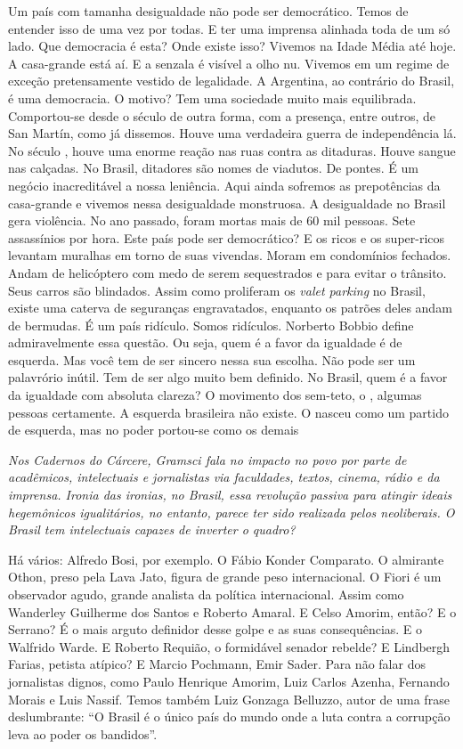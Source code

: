 \normalfont
Um país com tamanha desigualdade não pode ser
democrático. Temos de entender isso de uma vez por todas. E ter uma
imprensa alinhada toda de um só lado. Que democracia é esta? Onde existe
isso? Vivemos na Idade Média até hoje. A casa-grande está aí. E a
senzala é visível a olho nu. Vivemos em um regime de exceção
pretensamente vestido de legalidade. A Argentina, ao contrário do
Brasil, é uma democracia. O motivo? Tem uma sociedade muito mais
equilibrada. Comportou-se desde o século  de outra forma, com a
presença, entre outros, de San Martín, como já dissemos. Houve uma
verdadeira guerra de independência lá. No século , houve uma enorme
reação nas ruas contra as ditaduras. Houve sangue nas calçadas. No
Brasil, ditadores são nomes de viadutos. De pontes. É um negócio
inacreditável a nossa leniência. Aqui ainda sofremos as prepotências da
casa-grande e vivemos nessa desigualdade monstruosa. A desigualdade no
Brasil gera violência. No ano passado, foram mortas mais de 60 mil
pessoas. Sete assassínios por hora. Este país pode ser democrático? E os
ricos e os super-ricos levantam muralhas em torno de suas vivendas.
Moram em condomínios fechados. Andam de helicóptero com medo de serem
sequestrados e para evitar o trânsito. Seus carros são blindados. Assim
como proliferam os \emph{valet parking} no Brasil, existe uma caterva de
seguranças engravatados, enquanto os patrões deles andam de bermudas. É
um país ridículo. Somos ridículos. Norberto Bobbio define admiravelmente
essa questão. Ou seja, quem é a favor da igualdade é de esquerda. Mas
você tem de ser sincero nessa sua escolha. Não pode ser um palavrório
inútil. Tem de ser algo muito bem definido. No Brasil, quem é a favor da
igualdade com absoluta clareza? O movimento dos sem-teto, o , algumas
pessoas certamente. A esquerda brasileira não existe. O  nasceu como
um partido de esquerda, mas no poder portou-se como os demais

\itshape
 Nos \emph{Cadernos do Cárcere}, Gramsci fala no impacto
no povo por parte de acadêmicos, intelectuais e jornalistas via
faculdades, textos, cinema, rádio e da imprensa. Ironia das ironias, no
Brasil, essa revolução passiva para atingir ideais hegemônicos
igualitários, no entanto, parece ter sido realizada pelos neoliberais. O
Brasil tem intelectuais capazes de inverter o quadro?

\normalfont
Há vários: Alfredo Bosi, por exemplo. O Fábio Konder
Comparato. O almirante Othon, preso pela Lava Jato, figura de grande
peso internacional. O Fiori é um observador agudo, grande analista da
política internacional. Assim como Wanderley Guilherme dos Santos e
Roberto Amaral. E Celso Amorim, então? E o Serrano? É o mais arguto
definidor desse golpe e as suas consequências. E o Walfrido Warde. E
Roberto Requião, o formidável senador rebelde? E Lindbergh Farias,
petista atípico? E Marcio Pochmann, Emir Sader. Para não falar dos
jornalistas dignos, como Paulo Henrique Amorim, Luiz Carlos Azenha,
Fernando Morais e Luis Nassif. Temos também Luiz Gonzaga Belluzzo, autor
de uma frase deslumbrante: ``O Brasil é o único país do mundo onde a
luta contra a corrupção leva ao poder os bandidos''.

